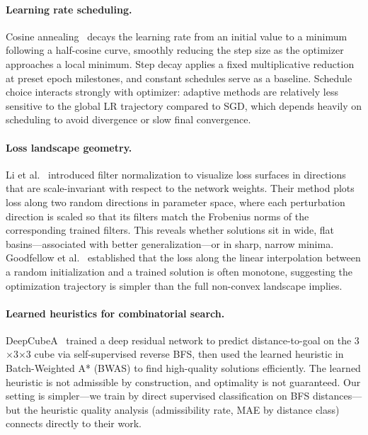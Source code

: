 \documentclass[11pt]{article}
\begin{document}
\paragraph{Learning rate scheduling.}
Cosine annealing~\cite{loshchilov2017sgdr} decays the learning rate from an
initial value to a minimum following a half-cosine curve, smoothly reducing
the step size as the optimizer approaches a local minimum.
Step decay applies a fixed multiplicative reduction at preset epoch milestones,
and constant schedules serve as a baseline.
Schedule choice interacts strongly with optimizer: adaptive methods are
relatively less sensitive to the global LR trajectory compared to SGD, which
depends heavily on scheduling to avoid divergence or slow final convergence.

\paragraph{Loss landscape geometry.}
Li et al.~\cite{li2018landscape} introduced filter normalization to visualize
loss surfaces in directions that are scale-invariant with respect to the network
weights. Their method plots loss along two random directions in parameter space,
where each perturbation direction is scaled so that its filters match the
Frobenius norms of the corresponding trained filters. This reveals whether
solutions sit in wide, flat basins---associated with better generalization---or
in sharp, narrow minima.
Goodfellow et al.~\cite{goodfellow2015landscape} established that the loss
along the linear interpolation between a random initialization and a trained
solution is often monotone, suggesting the optimization trajectory is simpler
than the full non-convex landscape implies.

\paragraph{Learned heuristics for combinatorial search.}
DeepCubeA~\cite{agostinelli2019deepcubea} trained a deep residual network to
predict distance-to-goal on the 3$\times$3$\times$3 cube via self-supervised
reverse BFS, then used the learned heuristic in Batch-Weighted A* (BWAS) to find
high-quality solutions efficiently. The learned heuristic is not admissible by
construction, and optimality is not guaranteed.
Our setting is simpler---we train by direct supervised classification on BFS
distances---but the heuristic quality analysis (admissibility rate, MAE by
distance class) connects directly to their work.
\end{document}
